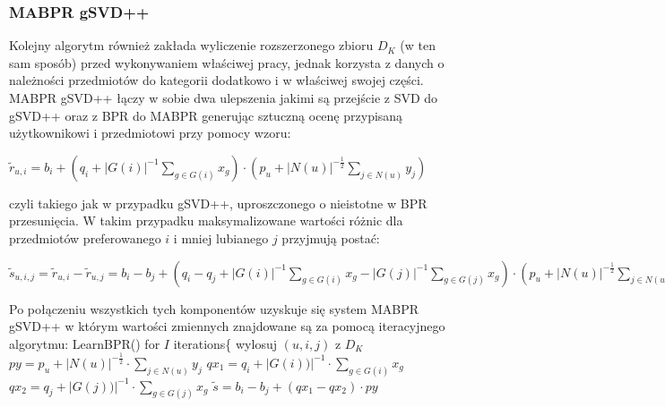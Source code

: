 \documentclass{pracamgr}
\begin{document}
    \subsubsection{MABPR gSVD++}
     Kolejny algorytm również zakłada wyliczenie rozszerzonego zbioru $D_K$ (w ten sam sposób) przed wykonywaniem właściwej pracy,
     jednak korzysta z danych o należności przedmiotów do kategorii dodatkowo i w właściwej swojej części.
     MABPR gSVD++ łączy w sobie dwa ulepszenia jakimi są przejście z SVD do gSVD++ oraz z BPR do MABPR generując sztuczną ocenę przypisaną
     użytkownikowi i przedmiotowi przy pomocy wzoru:
     \begin{center}
       $\tilde{r}_{u,i}=b_i+\left(q_i+|G(i)|^{-1}\sum\limits_{g\in G(i)}x_{g}\right)\cdot\left(p_u +|N(u)|^{-\frac{1}{2}}\sum\limits_{j\in N(u)}y_j\right)$
     \end{center}
     czyli takiego jak w przypadku gSVD++, uproszczonego o nieistotne w BPR przesunięcia.
     W takim przypadku maksymalizowane wartości różnic dla przedmiotów preferowanego $i$ i mniej lubianego $j$ przyjmują postać:
     \begin{center}
      $\tilde{s}_{u,i,j}=\tilde{r}_{u,i}-\tilde{r}_{u,j}=b_i-b_j+
      \left(q_i-q_j+|G(i)|^{-1}\sum\limits_{g\in G(i)}x_{g}-|G(j)|^{-1}\sum\limits_{g\in G(j)}x_{g}\right)
      \cdot\left(p_u +|N(u)|^{-\frac{1}{2}}\sum\limits_{j\in N(u)}y_j\right)$
     \end{center}
     Po połączeniu wszystkich tych komponentów uzyskuje się system MABPR gSVD++ w którym wartości zmiennych znajdowane są za pomocą iteracyjnego algorytmu:\newline
     \hspace*{16pt}	LearnBPR()\newline
     \hspace*{16pt}	for $I$ iterations\{\newline
     \hspace*{32pt}		wylosuj $(u,i,j)$ z $D_K$\newline 
     \hspace*{32pt}		$py=p_u +|N(u)|^{-\frac{1}{2}}\cdot\sum\limits_{j\in N(u)}y_j$\newline
     \hspace*{32pt}		$qx_1=q_i +|G(i))|^{-1}\cdot\sum\limits_{g\in G(i)}x_g$\newline
     \hspace*{32pt}		$qx_2=q_j +|G(j))|^{-1}\cdot\sum\limits_{g\in G(j)}x_g$\newline
     \hspace*{32pt}		$\tilde{s}=b_i-b_j+(qx_1-qx_2)\cdot py$\newline   
\end{document}
